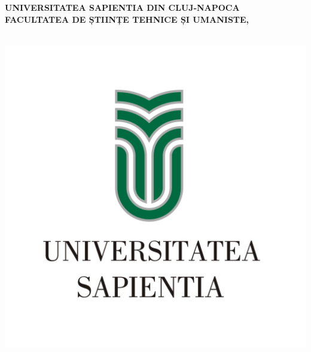 
\begin{titlepage}
	\begin{center}
	
		\large{\bfseries UNIVERSITATEA SAPIENTIA DIN CLUJ-NAPOCA} \\
		\large{\bfseries FACULTATEA DE ȘTIINȚE TEHNICE ȘI UMANISTE,} \\
		
		\large{\bfseries \szakRO} \\[2.5cm]
		
			\begin{center}
			\includegraphics[scale=2]{images/sapientia-ro}
		\end{center}
		
		\vspace{0.3cm}
		
	
		
		\Large{\Large \cimRO}\\[0.8cm]
		\vspace{0.2cm}
		\textsc{\Large \bfseries \dolgozattipusRO}\\[2.5cm]
		

\end{center}
\end{titlepage}
